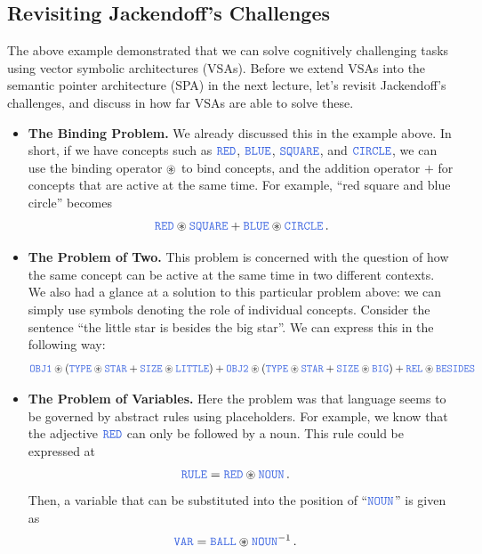 \documentclass[10pt,letterpaper,oneside]{article}
\begin{document}
\subsection{Revisiting Jackendoff's Challenges}

The above example demonstrated that we can solve cognitively challenging tasks using vector symbolic architectures (VSAs). Before we extend VSAs into the semantic pointer architecture (SPA) in the next lecture, let's revisit Jackendoff's challenges, and discuss in how far VSAs are able to solve these.

\begin{itemize}
	\item \textbf{The Binding Problem.} We already discussed this in the example above. In short, if we have concepts such as $\Obj{RED}$, $\Obj{BLUE}$, $\Obj{SQUARE}$, and $\Obj{CIRCLE}$, we can use the binding operator $\circledast$ to bind concepts, and the addition operator $+$ for concepts that are active at the same time. For example, \enquote{red square and blue circle} becomes
	\begin{align*}
		\Obj{RED} \CC \Obj{SQUARE} + \Obj{BLUE} \CC \Obj{CIRCLE} \,.
	\end{align*}
	\item \textbf{The Problem of Two.} This problem is concerned with the question of how the same concept can be active at the same time in two different contexts. We also had a glance at a solution to this particular problem above: we can simply use symbols denoting the role of individual concepts. Consider the sentence \enquote{the little star is besides the big star}. We can express this in the following way:
	\begin{align*}
		\Obj{OBJ1} \CC (\Obj{TYPE} \CC \Obj{STAR} + \Obj{SIZE} \CC \Obj{LITTLE}) + \Obj{OBJ2} \CC (\Obj{TYPE} \CC \Obj{STAR} + \Obj{SIZE} \CC \Obj{BIG}) + \Obj{REL} \CC \Obj{BESIDES}
	\end{align*}
	\item \textbf{The Problem of Variables.} Here the problem was that language seems to be governed by abstract rules using placeholders. For example, we know that the adjective $\Obj{RED}$ can only be followed by a noun. This rule could be expressed at
	\begin{align*}
		\Obj{RULE} &= \Obj{RED} \CC \Obj{NOUN} \,.
	\end{align*}
	Then, a variable that can be substituted into the position of \enquote{$\Obj{NOUN}$} is given as
	\begin{align*}
		\Obj{VAR} &= \Obj{BALL} \CC \Obj{NOUN}^{-1} \,.

\end{align*}
\end{itemize}
\end{document}
